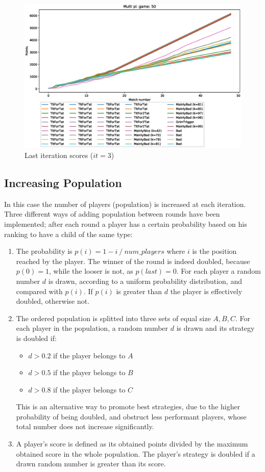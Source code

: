 \documentclass[journal,a4paper,10pt,twoside]{IEEEtran} %
\begin{document}
\begin{figure}[!ht]
    \centering
    \includegraphics[width=1\columnwidth]{../img/ripdmp-const/ripdmp-scores-const-pop-50-r3}
    \caption{Last iteration scores ($it=3$)}
    \label{fig:constLI}
\end{figure}

\subsection{Increasing Population}
In this case the number of players (population) is increased at each iteration. Three different ways of adding population between rounds have been implemented; after each round a player has a certain probability based on his ranking to have a child of the same type:
\begin{enumerate}
    \item The probability is $p(i)=1- i\ /\ num\_players$ where $i$ is the position reached by the player. The winner of the round is indeed doubled, because $p(0)=1$, while the looser is not, as $p(last)=0$.
    For each player a random number $d$ is drawn, according to a uniform probability distribution, and compared with $p(i)$. If $p(i)$ is greater than $d$ the player is effectively doubled, otherwise not.
    \item The ordered population is splitted into three sets of equal size $A,B,C$. For each player in the population, a random number $d$ is drawn and its strategy is doubled if:
    \begin{itemize}
        \item $d>0.2$ if the player belongs to $A$
        \item $d>0.5$ if the player belongs to $B$
        \item $d>0.8$ if the player belongs to $C$
    \end{itemize}
    This is an alternative way to promote best strategies, due to the higher probability of being doubled, and obstruct less performant players, whose total number does not increase significantly.
    \item A player's score is defined as its obtained points divided by the maximum obtained score in the whole population. The player's strategy is doubled if a drawn random number is greater than its score.
\end{enumerate}
\end{document}
